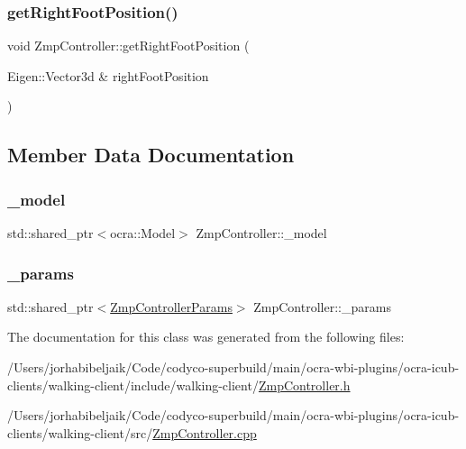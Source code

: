 \hypertarget{classZmpController_a815cd495f657cbd93c25610d24982e8c}{}\label{classZmpController_a815cd495f657cbd93c25610d24982e8c} 
\subsubsection{\texorpdfstring{get\+Right\+Foot\+Position()}{getRightFootPosition()}}
{\footnotesize\ttfamily void Zmp\+Controller\+::get\+Right\+Foot\+Position (\begin{DoxyParamCaption}\item[{Eigen\+::\+Vector3d \&}]{right\+Foot\+Position }\end{DoxyParamCaption})}



\subsection{Member Data Documentation}
\hypertarget{classZmpController_ac86a58d1f870ce27c78b0f6d2294e05f}{}\label{classZmpController_ac86a58d1f870ce27c78b0f6d2294e05f} 
\subsubsection{\texorpdfstring{\+\_\+model}{\_model}}
{\footnotesize\ttfamily std\+::shared\+\_\+ptr$<$ocra\+::\+Model$>$ Zmp\+Controller\+::\+\_\+model\hspace{0.3cm}{\ttfamily [private]}}

\hypertarget{classZmpController_a59a45aafc8a49a0d49966f7ed061a022}{}\label{classZmpController_a59a45aafc8a49a0d49966f7ed061a022} 
\subsubsection{\texorpdfstring{\+\_\+params}{\_params}}
{\footnotesize\ttfamily std\+::shared\+\_\+ptr$<$\hyperlink{structZmpControllerParams}{Zmp\+Controller\+Params}$>$ Zmp\+Controller\+::\+\_\+params\hspace{0.3cm}{\ttfamily [private]}}



The documentation for this class was generated from the following files\+:\begin{DoxyCompactItemize}
\item 
/\+Users/jorhabibeljaik/\+Code/codyco-\/superbuild/main/ocra-\/wbi-\/plugins/ocra-\/icub-\/clients/walking-\/client/include/walking-\/client/\hyperlink{ZmpController_8h}{Zmp\+Controller.\+h}\item 
/\+Users/jorhabibeljaik/\+Code/codyco-\/superbuild/main/ocra-\/wbi-\/plugins/ocra-\/icub-\/clients/walking-\/client/src/\hyperlink{ZmpController_8cpp}{Zmp\+Controller.\+cpp}\end{DoxyCompactItemize}
